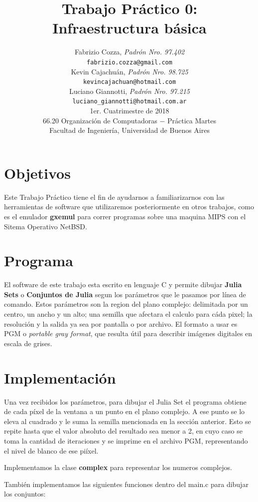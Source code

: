\documentclass[a4paper,10pt]{article}
\title{		\textbf{Trabajo Pr\'{a}ctico 0: \\
			Infraestructura b\'{a}sica
			}}
\author{	Fabrizio Cozza, \textit{Padr\'{o}n Nro. 97.402}                     \\
            \texttt{ fabrizio.cozza@gmail.com }                                              \\[2.5ex]
            Kevin Cajachu\'{a}n, \textit{Padr\'{o}n Nro. 98.725}                     \\
            \texttt{ kevincajachuan@hotmail.com }                                              \\[2.5ex]
            Luciano Giannotti, \textit{Padr\'{o}n Nro. 97.215}                     \\
            \texttt{luciano\_giannotti@hotmail.com.ar}                                              \\[3.5ex]
	 \newline
            \normalsize{1er. Cuatrimestre de 2018}                                      \\
            \normalsize{66.20 Organizaci\'{o}n de Computadoras  $-$ Pr\'{a}ctica Martes}  \\
            \normalsize{Facultad de Ingenier\'{i}a, Universidad de Buenos Aires}            \\
       }
\date{}
\begin{document}
\maketitle
\thispagestyle{empty}   %
\newpage

\section{Objetivos}

Este Trabajo Pr\'{a}ctico tiene el fin de ayudarnos a familiarizarnos con las herramientas de software que utilizaremos posteriormente en otros trabajos, como es el emulador \textbf{gxemul} para correr programas sobre una maquina MIPS con el Sitema Operativo NetBSD.


\section{Programa}

El software de este trabajo esta escrito en lenguaje C y permite dibujar \textbf{Julia Sets} o \textbf{Conjuntos de Julia} segun los par\'{a}metros que le pasamos por l\'{i}nea de comando.
Estos parámetros son la region del plano complejo: delimitada por un centro, un ancho y un alto; una semilla que afectara el calculo para c\'{a}da pixel; la resoluci\'{o}n y la salida ya sea por pantalla o por archivo.
El formato a usar es  PGM o \textit{portable gray format}, que resulta \'{u}til para describir im\'{a}genes digitales en escala de grises.


\section{Implementaci\'{o}n}

Una vez recibidos los par\'{a}metros, para dibujar el Julia Set el programa obtiene de cada p\'{i}xel de la ventana a un punto en el plano complejo.
A ese punto se lo eleva al cuadrado y le suma la semilla mencionada en la secci\'{o}n anterior. Esto se repite hasta que el valor absoluto del resultado sea menor a 2, en cuyo caso se toma la cantidad de iteraciones y se imprime en el archivo PGM, representando el nivel de blanco de ese pi\'{i}xel.

Implementamos la clase \textbf{complex} para representar los numeros complejos.

Tambi\'{e}n implementamos las siguientes funciones dentro del main.c para dibujar los conjuntos:
\end{document}
